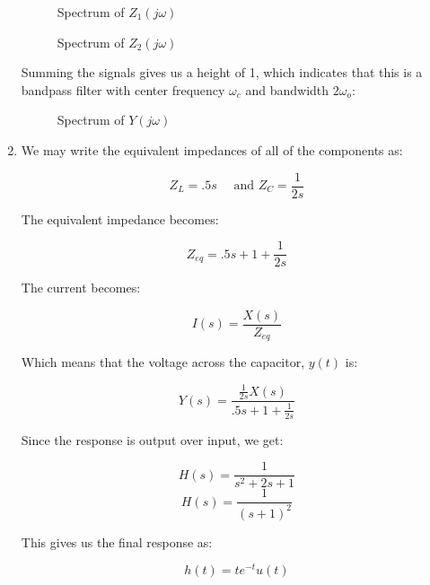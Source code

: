 \begin{enumerate}
    \begin{figure}[H]
      \centering
      
      \caption{Spectrum of $Z_1(j\omega)$}
      \label{fig:5}
    \end{figure}

    \begin{figure}[H]
      \centering
      
      \caption{Spectrum of $Z_2(j\omega)$}
      \label{fig:6}
    \end{figure}

    Summing the signals gives us a height of 1, which indicates that this is a bandpass filter with center frequency $\omega_c$ and bandwidth $2\omega_o$:

    \begin{figure}[H]
      \centering
      
      \caption{Spectrum of $Y(j\omega)$}
      \label{fig:7}
    \end{figure}

  \item We may write the equivalent impedances of all of the components as:

    $$Z_L=.5s\quad\text{ and }Z_C=\frac{1}{2s}$$

    The equivalent impedance becomes:

    $$Z_{eq}=.5s+1+\frac{1}{2s}$$

    The current becomes:

    $$I(s)=\frac{X(s)}{Z_{eq}}$$

    Which means that the voltage across the capacitor, $y(t)$ is:

    $$Y(s)=\frac{\frac{1}{2s}X(s)}{.5s+1+\frac{1}{2s}}$$

    Since the response is output over input, we get:

    $$H(s)=\frac{1}{s^2+2s+1}$$
    $$H(s)=\frac{1}{(s+1)^2}$$

    This gives us the final response as:

    $$\boxed{h(t)=te^{-t}u(t)}$$

\end{enumerate}



